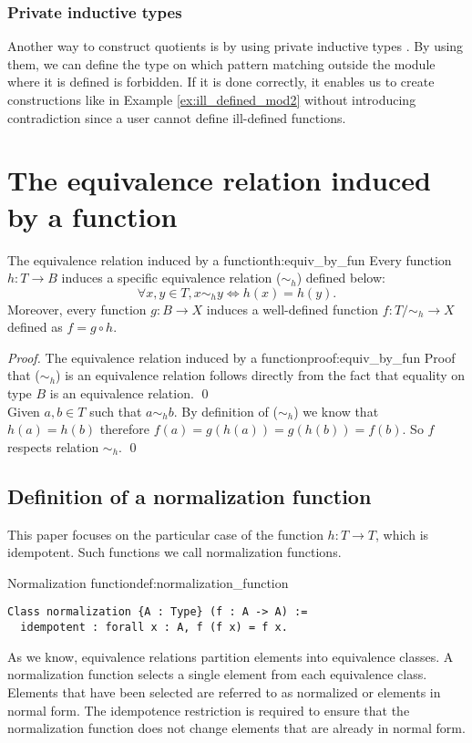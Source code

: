 \subsubsection{Private inductive types}
Another way to construct quotients is by using private inductive types \cite{PrivetInductive}. By using them, we can define the type on which pattern matching outside the module where it is defined is forbidden. If it is done correctly, it enables us to create constructions like in Example \ref{ex:ill_defined_mod2} without introducing contradiction since a user cannot define ill-defined functions.

\section{The equivalence relation induced by a function}
\begin{theo}{The equivalence relation induced by a function}{th:equiv_by_fun}
Every function $h: T \rightarrow B$ induces a specific equivalence relation ($\sim_h$) defined below:
$$ \forall x, y \in T, x \sim_h y \iff h(x) = h(y). $$
Moreover, every function $g: B \rightarrow X$ induces a well-defined function $f : T/\sim_h \rightarrow X$ defined as $f = g \circ h$. 
\end{theo}

\begin{proof}{The equivalence relation induced by a function}{proof:equiv_by_fun}
Proof that ($\sim_h$) is an equivalence relation follows directly from the fact that equality on type $B$ is an equivalence relation. \qed \\ 
Given $a, b \in T$ such that $a \sim_h b$. By definition of ($\sim_h$) we know that $h(a) = h(b)$ therefore $f(a) = g(h(a)) = g(h(b)) = f(b)$. So $f$ respects relation $\sim_h$. \qed
\end{proof}
\subsection{Definition of a normalization function}
This paper focuses on the particular case of the function $h: T \rightarrow T$, which is idempotent. Such functions we call normalization functions.
\begin{defi}{Normalization function}{def:normalization_function}
\begin{verbatim}
Class normalization {A : Type} (f : A -> A) := 
  idempotent : forall x : A, f (f x) = f x.
\end{verbatim}
\end{defi}
As we know, equivalence relations partition elements into equivalence classes. A normalization function selects a single element from each equivalence class. Elements that have been selected are referred to as normalized or elements in normal form. The idempotence restriction is required to ensure that the normalization function does not change elements that are already in normal form.

